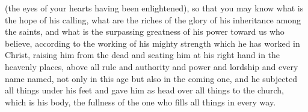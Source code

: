 \begin{biblechapter}
\verse (the eyes of your hearts having been enlightened), so that you may know what is the hope of his calling, what are the riches of the glory of his inheritance among the saints,
\verse and what is the surpassing greatness of his power toward us who believe, according to the working of his mighty strength
\verse which he has worked in Christ, raising him from the dead and seating him at his right hand in the heavenly places,
\verse above all rule and authority and power and lordship and every name named, not only in this age but also in the coming one,
\verse and he subjected all things under his feet and gave him as head over all things to the church,
\verse which is his body, the fullness of the one who fills all things in every way.
\end{biblechapter}

